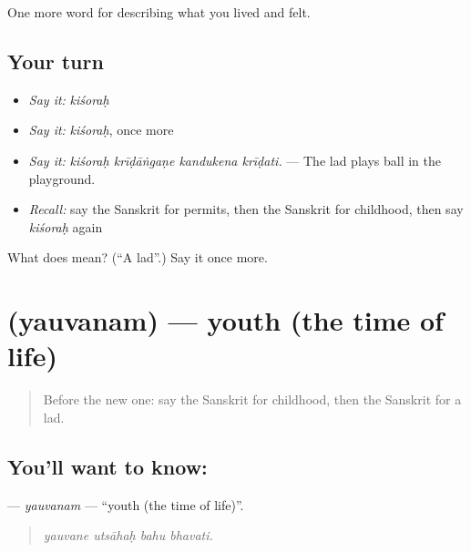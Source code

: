 \begin{grammarlens}[title={What you've built}]
One more word for describing what you lived and felt.
\end{grammarlens}

\subsection*{Your turn}
\begin{itemize}
\raggedright
  \item \emph{Say it:} \emph{kiśoraḥ}
  \item \emph{Say it:} \emph{kiśoraḥ}, once more
  \item \emph{Say it:} \emph{kiśoraḥ krīḍāṅgaṇe kandukena krīḍati.} — The lad plays ball in the playground.
  \item \emph{Recall:} say the Sanskrit for permits, then the Sanskrit for childhood, then say \emph{kiśoraḥ} again
\end{itemize}

\begin{tcolorbox}[breakable,colback=teal!4,colframe=teal!35!black,title={Before you move on}]
What does  mean? (\textquotedblleft{}A lad\textquotedblright{}.) Say it once more.
\end{tcolorbox}
\section[\texorpdfstring{\sk{यौवनम्} (yauvanam)}{यौवनम् (yauvanam)}]{ (yauvanam) — youth (the time of life)}

\label{lesson:SA-C495-yauvanam}



\begin{quote}
Before the new one: say the Sanskrit for childhood, then the Sanskrit for a lad.
\end{quote}

\subsection*{You'll want to know: }
\textbf{} — \emph{yauvanam} — \textquotedblleft{}youth (the time of life)\textquotedblright{}.

\begin{quote}
   
\end{quote}

\begin{quote}
\emph{yauvane utsāhaḥ bahu bhavati.}
\end{quote}

